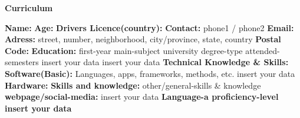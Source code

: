 \documentclass[a4paper,10pt]{report}
\begin{document}
\pagestyle{empty}
\begin{center}
  \huge
  \vspace*{-1.5cm}
  \textbf{Curriculum}
  \vspace*{.5\baselineskip}
  \end{center}
  \begin{flushleft}
  \textbf{Name:} 
  \linebreak
  \textbf{Age:} 
  \textbf{Drivers Licence(country):} 
  \linebreak
  \textbf{Contact:} phone1 / phone2
  \linebreak
  \textbf{Email:} 
  \textbf{Adress:} street, number, neighborhood, city/province, state, country
  \textbf{Postal Code:} 
  \linebreak
  \linebreak
  \textbf{Education:}
  \vspace*{0.5\baselineskip}
  \linebreak
  first-year main-subject university
  \linebreak
  degree-type attended-semesters
  \vspace*{0.5\baselineskip}
  \linebreak 
  insert your data
  \linebreak 
  insert your data
  \linebreak 
  \linebreak 
  \textbf{Technical Knowledge \& Skills:}
  \vspace*{0.5\baselineskip}
  \linebreak
  \textbf{Software(Basic):} Languages, apps, frameworks, methods, etc.
  \linebreak
  insert your data
  \vspace*{0.25\baselineskip}
  \linebreak
  \textbf{Hardware:} 
  \vspace*{0.25\baselineskip}
  \linebreak
  \textbf{Skills and knowledge:} other/general-skills \& knowledge
  \vspace*{0.25\baselineskip}
  \linebreak
  \textbf{webpage/social-media:} insert your data
  \vspace*{0.25\baselineskip}
  \linebreak
   \textbf{Language-a proficiency-level}
   \linebreak
   \textbf{insert your data}     
   \linebreak

\end{flushleft}
\end{document}
